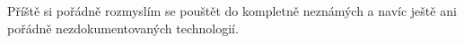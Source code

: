 



Příště si pořádně rozmyslím se pouštět do kompletně neznámých a navíc ještě ani pořádně nezdokumentovaných technologií.


% 
% 
% 
